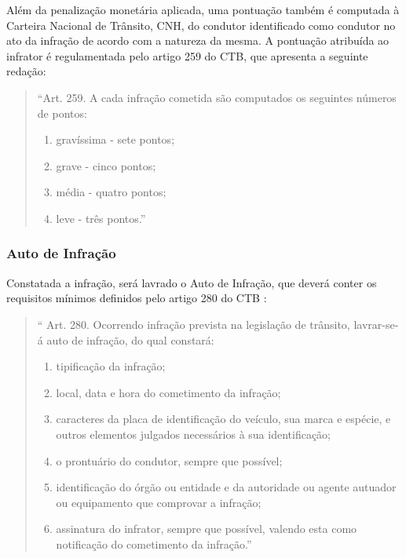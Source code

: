     Além da penalização monetária aplicada, uma pontuação também é computada à Carteira Nacional de Trânsito, CNH, do condutor identificado como condutor no ato da infração de acordo com a natureza da mesma. A pontuação atribuída ao infrator é regulamentada pelo artigo 259 do CTB, que apresenta a seguinte redação:
        
        \renewcommand{\theenumi}{\Roman{enumi}}%
        \begin{quote}
            ``Art. 259. A cada infração cometida são computados os seguintes números de pontos:
            
                \begin{enumerate}
                  \item gravíssima - sete pontos;
                  \item grave - cinco pontos;
                  \item média - quatro pontos;
                  \item leve - três pontos.''
                \end{enumerate}
        \end{quote}
        
    \subsubsection{Auto de Infração}
    \label{estrutura_auto_infracao}

    Constatada a infração, será lavrado o Auto de Infração, que deverá conter os requisitos mínimos definidos pelo artigo 280 do CTB \cite{codigo_transito_bra}:

    \begin{quote}
        `` Art. 280. Ocorrendo infração prevista na legislação de trânsito, lavrar-se-á auto de infração, do qual constará:

            \renewcommand{\theenumi}{\Roman{enumi}}%
            \begin{enumerate}
              \item tipificação da infração;
              \item local, data e hora do cometimento da infração;
              \item caracteres da placa de identificação do veículo, sua marca e espécie, e outros elementos julgados necessários à sua identificação;
              \item o prontuário do condutor, sempre que possível;
              \item identificação do órgão ou entidade e da autoridade ou agente autuador ou equipamento que comprovar a infração;
              \item assinatura do infrator, sempre que possível, valendo esta como notificação do cometimento da infração.''
            \end{enumerate}
    \end{quote}



